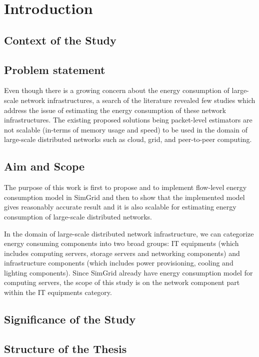\chapter{Introduction}
\label{chapter:intro}

\section{Context of the Study}
	 

\section{Problem statement}
Even though there is a growing concern about the energy consumption of large-scale network infrastructures, a search of the literature revealed few studies which address the issue of estimating the energy consumption of these network infrastructures. The existing proposed solutions being packet-level estimators are not scalable (in-terms of memory usage and speed) to be used in the domain of large-scale distributed networks such as cloud, grid, and peer-to-peer computing. 

\section{Aim and Scope}

The purpose of this work is first to propose and to implement flow-level energy consumption model in SimGrid and then to show that the implemented model gives reasonably accurate result and it is also scalable for estimating energy consumption of large-scale distributed networks.

In the domain of large-scale distributed network infrastructure, we can categorize energy consuming components into two broad groups: IT equipments (which includes computing servers, storage servers and networking components) and infrastructure components (which includes power provisioning, cooling and lighting components). Since SimGrid already have energy consumption model for computing servers, the scope of this study is on the network component part within the IT equipments category.

\section{Significance of the Study}

\section{Structure of the Thesis}
\label{section:structure} 


